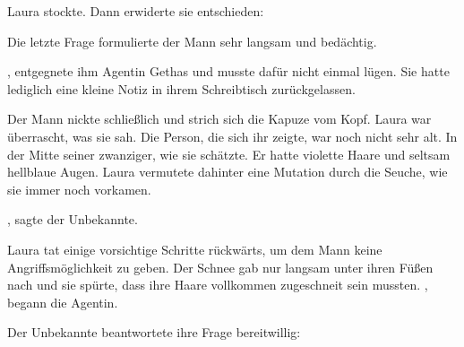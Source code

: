 
\par

Laura stockte. Dann erwiderte sie entschieden: 

\par


\par


\par

Die letzte Frage formulierte der Mann sehr langsam und bedächtig. 

\par

, entgegnete ihm Agentin Gethas und musste dafür nicht einmal lügen. Sie hatte lediglich eine kleine Notiz in ihrem Schreibtisch zurückgelassen.

\par

Der Mann nickte schließlich und strich sich die Kapuze vom Kopf. Laura war überrascht, was sie sah. Die Person, die sich ihr zeigte, war noch nicht sehr alt. In der Mitte seiner zwanziger, wie sie schätzte. Er hatte violette Haare und seltsam hellblaue Augen. Laura vermutete dahinter eine Mutation durch die Seuche, wie sie immer noch vorkamen.

\par

, sagte der Unbekannte. 

\par

Laura tat einige vorsichtige Schritte rückwärts, um dem Mann keine Angriffsmöglichkeit zu geben. Der Schnee gab nur langsam unter ihren Füßen nach und sie spürte, dass ihre Haare vollkommen zugeschneit sein mussten. , begann die Agentin. 

\par

Der Unbekannte beantwortete ihre Frage bereitwillig: 

